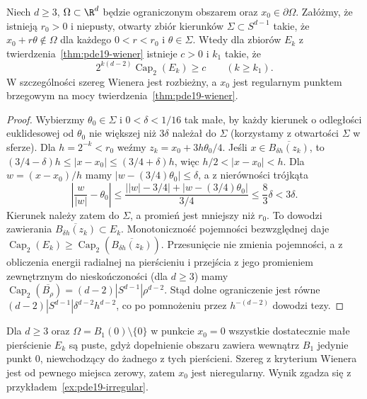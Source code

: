 \begin{stwierdzenie}
\label{prop:pde19-cone-wiener}
Niech $d\ge3$, $\Omega\subset\R^d$ będzie ograniczonym obszarem
oraz $x_0\in\partial\Omega$. Załóżmy, że istnieją $r_0>0$
i niepusty, otwarty zbiór kierunków $\Sigma\subset S^{d-1}$
takie, że $x_0+r\theta\notin\Omega$ dla każdego
$0<r<r_0$ i $\theta\in\Sigma$.
Wtedy dla zbiorów $E_k$ z twierdzenia~\ref{thm:pde19-wiener}
istnieje $c>0$ i $k_1$ takie, że
\[
  2^{k(d-2)}\operatorname{Cap}_2(E_k)\ge c
  \qquad(k\ge k_1).
\]
W szczególności szereg Wienera jest rozbieżny, a
$x_0$ jest regularnym punktem brzegowym na mocy
twierdzenia~\ref{thm:pde19-wiener}.
\end{stwierdzenie}
\begin{proof}
Wybierzmy $\theta_0\in\Sigma$ i $0<\delta<1/16$
tak małe, by każdy kierunek o odległości euklidesowej
od $\theta_0$ nie większej niż $3\delta$ należał do
$\Sigma$ (korzystamy z otwartości $\Sigma$ w sferze).
Dla $h=2^{-k}<r_0$ weźmy $z_k=x_0+3h\theta_0/4$.
Jeśli $x\in\overline{B_{\delta h}(z_k)}$, to
$(3/4-\delta)h\le|x-x_0|\le(3/4+\delta)h$,
więc $h/2<|x-x_0|<h$. Dla $w=(x-x_0)/h$ mamy
$|w-(3/4)\theta_0|\le\delta$, a z nierówności trójkąta
\[
 \left|\frac{w}{|w|}-\theta_0\right|
 \le\frac{\bigl||w|-3/4\bigr|+|w-(3/4)\theta_0|}{3/4}
 \le\frac83\delta<3\delta.
\]
Kierunek należy zatem do $\Sigma$, a promień jest
mniejszy niż $r_0$. To dowodzi zawierania
$\overline{B_{\delta h}(z_k)}\subset E_k$.
Monotoniczność pojemności bezwzględnej daje
$\operatorname{Cap}_2(E_k)\ge
\operatorname{Cap}_2(\overline{B_{\delta h}(z_k)})$.
Przesunięcie nie zmienia pojemności, a z obliczenia energii
radialnej na pierścieniu i przejścia z jego promieniem
zewnętrznym do nieskończoności (dla $d\ge3$) mamy
$\operatorname{Cap}_2(\overline{B_\rho})
=(d-2)|S^{d-1}|\rho^{d-2}$.
Stąd dolne ograniczenie jest równe
$(d-2)|S^{d-1}|\delta^{d-2}h^{d-2}$, co po
pomnożeniu przez $h^{-(d-2)}$ dowodzi tezy.
\end{proof}

\begin{przyklad}
\label{ex:pde19-wiener-puncture}
Dla $d\ge3$ oraz $\Omega=B_1(0)\setminus\{0\}$
w punkcie $x_0=0$ wszystkie dostatecznie małe pierścienie
$E_k$ są puste, gdyż dopełnienie obszaru zawiera
wewnątrz $B_1$ jedynie punkt $0$, niewchodzący do
żadnego z tych pierścieni. Szereg z kryterium Wienera jest od pewnego miejsca
zerowy, zatem $x_0$ jest nieregularny. Wynik zgadza się
z przykładem~\ref{ex:pde19-irregular}.
\end{przyklad}



